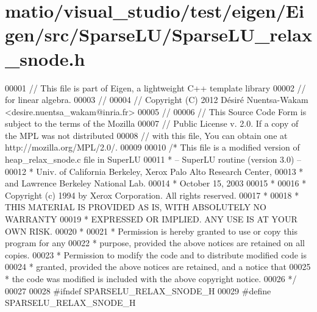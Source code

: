 \hypertarget{matio_2visual__studio_2test_2eigen_2_eigen_2src_2_sparse_l_u_2_sparse_l_u__relax__snode_8h_source}{}\section{matio/visual\+\_\+studio/test/eigen/\+Eigen/src/\+Sparse\+L\+U/\+Sparse\+L\+U\+\_\+relax\+\_\+snode.h}
\label{matio_2visual__studio_2test_2eigen_2_eigen_2src_2_sparse_l_u_2_sparse_l_u__relax__snode_8h_source}

\begin{DoxyCode}
00001 \textcolor{comment}{// This file is part of Eigen, a lightweight C++ template library}
00002 \textcolor{comment}{// for linear algebra.}
00003 \textcolor{comment}{//}
00004 \textcolor{comment}{// Copyright (C) 2012 Désiré Nuentsa-Wakam <desire.nuentsa\_wakam@inria.fr>}
00005 \textcolor{comment}{//}
00006 \textcolor{comment}{// This Source Code Form is subject to the terms of the Mozilla}
00007 \textcolor{comment}{// Public License v. 2.0. If a copy of the MPL was not distributed}
00008 \textcolor{comment}{// with this file, You can obtain one at http://mozilla.org/MPL/2.0/.}
00009 
00010 \textcolor{comment}{/* This file is a modified version of heap\_relax\_snode.c file in SuperLU}
00011 \textcolor{comment}{ * -- SuperLU routine (version 3.0) --}
00012 \textcolor{comment}{ * Univ. of California Berkeley, Xerox Palo Alto Research Center,}
00013 \textcolor{comment}{ * and Lawrence Berkeley National Lab.}
00014 \textcolor{comment}{ * October 15, 2003}
00015 \textcolor{comment}{ *}
00016 \textcolor{comment}{ * Copyright (c) 1994 by Xerox Corporation.  All rights reserved.}
00017 \textcolor{comment}{ *}
00018 \textcolor{comment}{ * THIS MATERIAL IS PROVIDED AS IS, WITH ABSOLUTELY NO WARRANTY}
00019 \textcolor{comment}{ * EXPRESSED OR IMPLIED.  ANY USE IS AT YOUR OWN RISK.}
00020 \textcolor{comment}{ *}
00021 \textcolor{comment}{ * Permission is hereby granted to use or copy this program for any}
00022 \textcolor{comment}{ * purpose, provided the above notices are retained on all copies.}
00023 \textcolor{comment}{ * Permission to modify the code and to distribute modified code is}
00024 \textcolor{comment}{ * granted, provided the above notices are retained, and a notice that}
00025 \textcolor{comment}{ * the code was modified is included with the above copyright notice.}
00026 \textcolor{comment}{ */}
00027 
00028 \textcolor{preprocessor}{#ifndef SPARSELU\_RELAX\_SNODE\_H}
00029 \textcolor{preprocessor}{#define SPARSELU\_RELAX\_SNODE\_H}

\end{DoxyCode}
